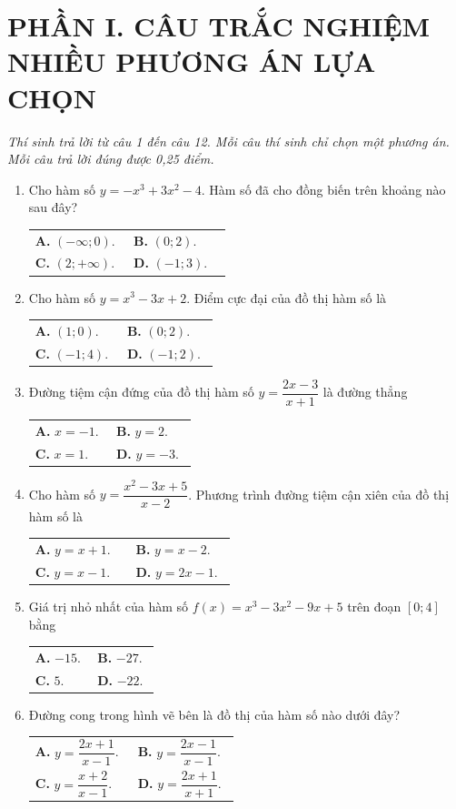 \documentclass[12pt,a4paper]{article}
\makeatletter
\newcommand{\bonpa}[4]{\par\smallskip\noindent
\begin{tabular}{@{}p{0.47\linewidth}p{0.47\linewidth}@{}}
\textbf{A.} #1 & \textbf{B.} #2\\[3pt]
\textbf{C.} #3 & \textbf{D.} #4\end{tabular}}
\makeatother
\begin{document}
\section*{\large PHẦN I. CÂU TRẮC NGHIỆM NHIỀU PHƯƠNG ÁN LỰA CHỌN}
\textit{Thí sinh trả lời từ câu 1 đến câu 12. Mỗi câu thí sinh chỉ chọn một phương án. Mỗi câu trả lời đúng được 0,25 điểm.}
\begin{enumerate}
\item Cho hàm số $y = -x^3 + 3x^2 - 4$. Hàm số đã cho đồng biến trên khoảng nào sau đây?
\bonpa{$(-\infty; 0)$.}{$(0; 2)$.}{$(2; +\infty)$.}{$(-1; 3)$.}

\item Cho hàm số $y = x^3 - 3x + 2$. Điểm cực đại của đồ thị hàm số là
\bonpa{$(1; 0)$.}{$(0; 2)$.}{$(-1; 4)$.}{$(-1; 2)$.}

\item Đường tiệm cận đứng của đồ thị hàm số $y = \dfrac{2x - 3}{x + 1}$ là đường thẳng
\bonpa{$x = -1$.}{$y = 2$.}{$x = 1$.}{$y = -3$.}

\item Cho hàm số $y = \dfrac{x^2 - 3x + 5}{x - 2}$. Phương trình đường tiệm cận xiên của đồ thị hàm số là
\bonpa{$y = x + 1$.}{$y = x - 2$.}{$y = x - 1$.}{$y = 2x - 1$.}

\item Giá trị nhỏ nhất của hàm số $f(x) = x^3 - 3x^2 - 9x + 5$ trên đoạn $[0; 4]$ bằng
\bonpa{$-15$.}{$-27$.}{$5$.}{$-22$.}

\item \begin{minipage}[t]{0.56\linewidth}
Đường cong trong hình vẽ bên là đồ thị của hàm số nào dưới đây?
\bonpa{$y = \dfrac{2x+1}{x-1}$.}{$y = \dfrac{2x-1}{x-1}$.}{$y = \dfrac{x+2}{x-1}$.}{$y = \dfrac{2x+1}{x+1}$.}
\end{minipage}\hfill
\begin{minipage}[t]{0.41\linewidth}\vspace{-0.4\baselineskip}\centering
{}
\end{minipage}


\end{enumerate}
\end{document}
